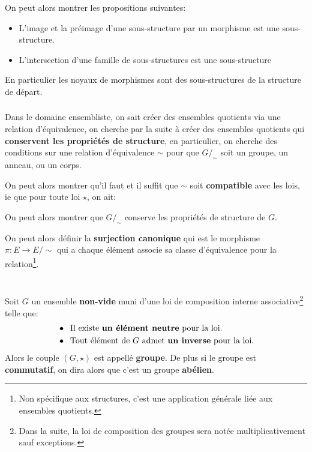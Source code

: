 On peut alors montrer les propositions suivantes:
\begin{itemize}
   \item L'image et la préimage d'une sous-structure par un morphisme est une sous-structure.
   \item L'intersection d'une famille de sous-structures est une sous-structure
\end{itemize}
En particulier les noyaux de morphismes sont des sous-structures de la structure de départ.

\subsection*{}
Dans le domaine ensembliste, on sait créer des ensembles quotients via une relation d'équivalence, on cherche par la suite à créer des ensembles quotients qui \textbf{conservent les propriétés de structure}, en particulier, on cherche des conditions sur une relation d'équivalence \(\sim\) pour que \(G/_\sim\) soit un groupe, un anneau, ou un corps.

On peut alors montrer qu'il faut et il suffit que \(\sim\) soit \textbf{compatible} avec les lois, ie que pour toute loi \(\star\), on ait:

On peut alors montrer que \(G/_\sim\) conserve les propriétés de structure de \(G\).\<

On peut alors définir la \textbf{surjection canonique} qui est le morphisme \(\pi : E \rightarrow E /\sim\) qui a chaque élément associe sa classe d'équivalence pour la relation\footnote[1]{Non spécifique aux structures, c'est une application générale liée aux ensembles quotients.}. 
\chapter*{}

Soit \(G\) un ensemble \textbf{non-vide} muni d'une loi de composition interne associative\footnote[1]{Dans la suite, la loi de composition des groupes sera notée multiplicativement sauf exceptions.} telle que:
\begin{align*}
   &\bullet \;\; \text{Il existe \textbf{un élément neutre} pour la loi.} \\
   &\bullet \;\; \text{Tout élément de \(G\) admet \textbf{un inverse} pour la loi.}
\end{align*}
Alors le couple \((G, \star)\) est appellé \textbf{groupe}. De plus si le groupe est \textbf{commutatif}, on dira alors que c'est un groupe \textbf{abélien}.\<

